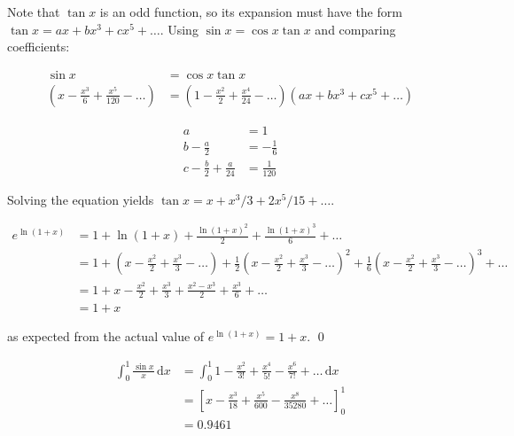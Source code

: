\documentclass[12pt]{article}
\begin{document}
Note that $\tan{x}$ is an odd function, so its expansion must have the form $\tan{x} = ax + bx^{3} + cx^{5} + \dots$. Using $\sin{x} = \cos{x} \tan{x}$ and comparing coefficients:

\begin{equation}
    \begin{split}
        \sin{x} &= \cos{x} \tan{x} \\
        \left( x - \frac{x^{3}}{6} + \frac{x^{5}}{120} - \dots \right) &= \left( 1 - \frac{x^{2}}{2} + \frac{x^{4}}{24} - \dots \right) \left( ax + bx^{3} + cx^{5} + \dots \right)
    \end{split}
\end{equation}

\begin{equation}
    \begin{split}
        a &= 1 \\
        b - \frac{a}{2} &= -\frac{1}{6} \\
        c - \frac{b}{2} + \frac{a}{24} &= \frac{1}{120}
    \end{split}
\end{equation}

Solving the equation yields $\tan{x} = x + x^{3}/3 + 2x^{5}/15 + \dots$.


\begin{equation}
    \begin{split}
        e^{\ln{(1 + x)}} &= 1 + \ln{(1 + x)} + \frac{\ln{(1 + x)}^{2}}{2} + \frac{\ln{(1 + x)}^{3}}{6} + \dots \\
        &= 1 + \left( x - \frac{x^{2}}{2} + \frac{x^{3}}{3} - \dots \right) + \frac{1}{2} \left( x - \frac{x^{2}}{2} + \frac{x^{3}}{3} - \dots \right)^{2} + \frac{1}{6} \left( x - \frac{x^{2}}{2} + \frac{x^{3}}{3} - \dots \right)^{3} + \dots \\
        &= 1 + x - \frac{x^{2}}{2} + \frac{x^{3}}{3} + \frac{x^{2} - x^{3}}{2} + \frac{x^{3}}{6} + \dots \\
        &= 1 + x
    \end{split}
\end{equation}

as expected from the actual value of $e^{\ln{(1 + x)}} = 1 + x$.
\qed



\begin{equation}
    \begin{split}
        \int_{0}^{1} \frac{\sin{x}}{x} \, \mathrm{d}x &= \int_{0}^{1} 1 - \frac{x^{2}}{3!} + \frac{x^{4}}{5!} - \frac{x^{6}}{7!} + \dots \, \mathrm{d}x \\
        &= \left[ x - \frac{x^{3}}{18} + \frac{x^{5}}{600} - \frac{x^{8}}{35280} + \dots \right]_{0}^{1} \\
        &= 0.9461
    \end{split}
\end{equation}
\end{document}
